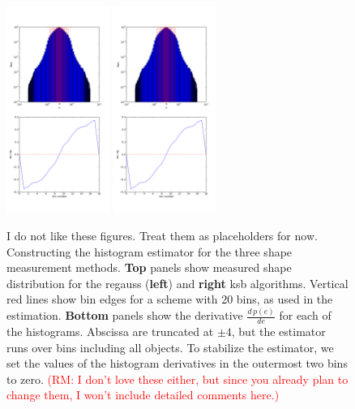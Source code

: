 \documentclass[iop]{emulateapj}
\newcommand\rmcomment[1]{\textcolor{red}{(RM: #1)}}
\begin{document}
\begin{figure}
\begin{center}
\includegraphics[width=0.3\textwidth]{./Plots/regauss-opt-shear_plots-prior_derivs.png}
\includegraphics[width=0.3\textwidth]{./Plots/ksb-opt-shear_plots-prior_derivs.png}
\end{center}
\caption{I do not like these figures. Treat them as placeholders for now.\\
  Constructing the histogram estimator for the three shape measurement
  methods. {\bf Top} panels show measured shape distribution for the
  regauss ({\bf left}) and {\bf right} ksb algorithms. Vertical red
  lines show bin edges for a scheme with 20 bins, as used in the
  estimation. {\bf Bottom} panels show the derivative
  $\frac{d\,p(e)}{d{e}}$ for each of the histograms. Abscissa are
  truncated at $\pm 4$, but the estimator runs over bins including all
  objects. To stabilize the estimator, we set the values of the
  histogram derivatives in the outermost two bins to zero.
\rmcomment{I don't love these either, but since you already plan to change them, I won't include
  detailed comments here.}
}
\label{fig:estimator}
\end{figure}
\end{document}
